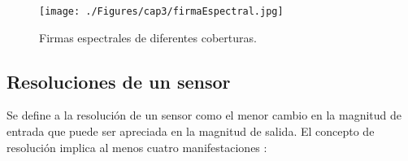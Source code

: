 \begin{figure}[!hbtp]
	\centering
	\texttt{[image: ./Figures/cap3/firmaEspectral.jpg]}
	\caption{Firmas espectrales de diferentes coberturas.}
	\label{fig:firmaEspectral}
\end{figure}

\subsection{Resoluciones de un sensor}

Se define a la resoluci\'on de un sensor como el menor cambio en la magnitud de entrada que puede ser apreciada en la magnitud de salida. El concepto de resoluci\'on implica al menos cuatro manifestaciones \cite{peralta2013analisis}: 
	\begin{itemize}
		

\end{itemize}
